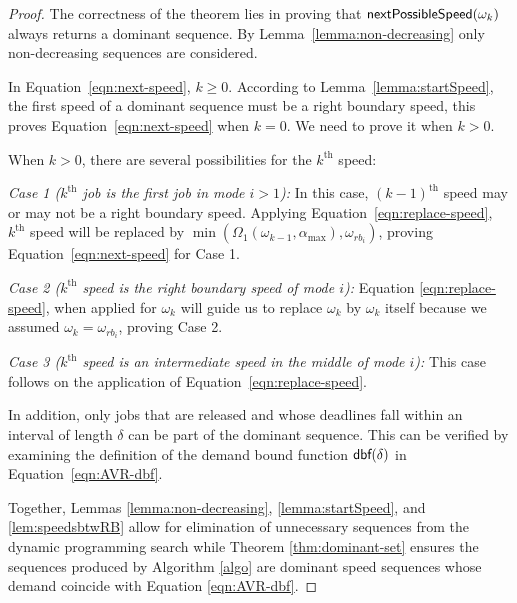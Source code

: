\begin{proof}
The correctness of the theorem lies in proving that ${\sf nextPossibleSpeed}(\omega_k)$ always returns a  dominant sequence.  By Lemma~\ref{lemma:non-decreasing} only non-decreasing sequences are considered.

In Equation~\ref{eqn:next-speed}, $k\geq0$. According to Lemma~\ref{lemma:startSpeed}, the first speed of a dominant sequence must be a right boundary speed, this proves Equation~\ref{eqn:next-speed} when $k=0$. We need to prove it when $k>0$.

When $k>0$, there are several possibilities for the $k^{\mathrm{th}}$ speed: %

\emph{Case 1 ($k^{\mathrm{th}}$ job is the first job in mode $i>1$):}
In this case, $(k-1)^{\mathrm{th}}$ speed may or may not be a  right boundary speed. Applying Equation~\ref{eqn:replace-speed}, $k^{\mathrm{th}}$ speed will be replaced by $\min(\Omega_1(\omega_{k-1},\alpha_{\max}),\omega_{rb_i})$, proving Equation~\ref{eqn:next-speed} for Case 1.

\emph{Case 2 ($k^{\mathrm{th}}$ speed is the right boundary speed of mode $i$):}
Equation \ref{eqn:replace-speed},  when applied for $\omega_k$ will guide us to replace $\omega_k$ by $\omega_k$ itself because we assumed $\omega_k=\omega_{rb_i}$, proving Case 2.

\emph{Case 3 ($k^{\mathrm{th}}$ speed is an intermediate speed in the middle of mode $i$):}
This case follows on the application of Equation~\ref{eqn:replace-speed}.

In addition, only jobs that are released and whose deadlines fall within an interval of length $\delta$ can be part of the dominant sequence. This can be verified by examining the definition of the demand bound function $\mbox{\sf dbf}(\delta)$ in Equation~\ref{eqn:AVR-dbf}.

Together, Lemmas \ref{lemma:non-decreasing}, \ref{lemma:startSpeed}, and \ref{lem:speedsbtwRB} allow for elimination of unnecessary sequences from the dynamic programming search while Theorem \ref{thm:dominant-set} ensures the sequences produced by Algorithm \ref{algo} are dominant speed sequences whose demand coincide with Equation \ref{eqn:AVR-dbf}.
\end{proof}

